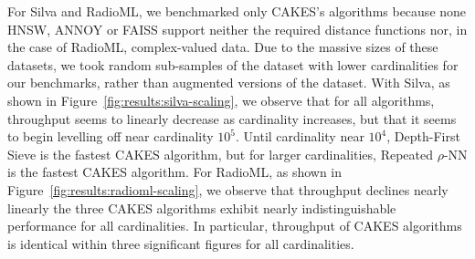 For Silva and RadioML, we benchmarked only CAKES's algorithms because none HNSW, ANNOY or FAISS support neither the required distance functions nor, in the case of RadioML, complex-valued data.
Due to the massive sizes of these datasets, we took random sub-samples of the dataset with lower cardinalities for our benchmarks, rather than augmented versions of the dataset.
With Silva, as shown in Figure~\ref{fig:results:silva-scaling}, we observe that for all algorithms, throughput seems to linearly decrease as cardinality increases, but that it seems to begin levelling off near cardinality $10^5$.
Until cardinality near $10^4$, Depth-First Sieve is the fastest CAKES algorithm, but for larger cardinalities, Repeated $\rho$-NN is the fastest CAKES algorithm.
For RadioML, as shown in Figure~\ref{fig:results:radioml-scaling}, we observe that throughput declines nearly linearly the three CAKES algorithms exhibit nearly indistinguishable performance for all cardinalities.
In particular, throughput of CAKES algorithms is identical within three significant figures for all cardinalities.

